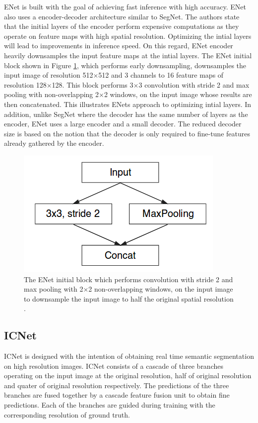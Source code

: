 ENet \cite{DBLP:journals/corr/PaszkeCKC16} is built with the goal of achieving fast inference with high accuracy. ENet also uses a encoder-decoder architecture similar to SegNet. The authors state that the initial layers of the encoder perform expensive computations as they operate on feature maps with high spatial resolution. Optimizing the intial layers will lead to improvements in inference speed. On this regard, ENet encoder heavily downsamples the input feature maps at the intial layers. The ENet initial block shown in Figure \ref{Fig:enet}, which performs early downsampling, downsamples the input image of resolution 512$\times$512 and 3 channels to 16 feature maps of resolution 128$\times$128. This block performs 3$\times$3 convolution with stride 2 and max pooling with non-overlapping 2$\times$2 windows, on the input image whose results are then concatenated. This illustrates ENets approach to optimizing intial layers. In addition, unlike SegNet where the decoder has the same number of layers as the encoder, ENet uses a large encoder and a small decoder. The reduced decoder size is based on the notion that the decoder is only required to fine-tune features already gathered by the encoder. 

	\begin{figure}[h]
		\centering
		\includegraphics[width=.4\linewidth]{images/enet}
		\caption{The ENet initial block which performs convolution with stride 2 and max pooling with 2$\times$2 non-overlapping windows, on the input image to downsample the input image to half the original spatial resolution \cite{DBLP:journals/corr/PaszkeCKC16}.}
		\label{Fig:enet}
	\end{figure}

\subsection{ICNet}

ICNet \cite{DBLP:journals/corr/ZhaoQSSJ17} is designed with the intention of obtaining real time semantic segmentation on high resolution images. ICNet consists of a cascade of three branches operating on the input image at the original resolution, half of original resolution and quater of original resolution respectively. The predictions of the three branches are fused together by a cascade feature fusion unit to obtain fine predictions. Each of the branches are guided during training with the corresponding resolution of ground truth. 

